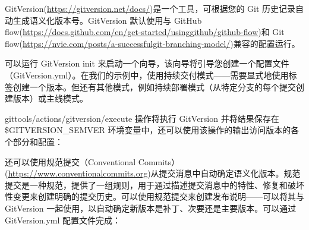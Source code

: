 

GitVersion(\url{https://gitversion.net/docs/})是一个工具，可根据您的 Git 历史记录自动生成语义化版本号。GitVersion 默认使用与 GitHub flow(\url{https://docs.github.com/en/get-started/usinggithub/github-flow})和 Git flow(\url{https://nvie.com/posts/a-successfulgit-branching-model/})兼容的配置运行。

可以运行 GitVersion init 来启动一个向导，该向导将引导您创建一个配置文件（GitVersion.yml）。在我们的示例中，使用持续交付模式——需要显式地使用标签创建一个版本。但还有其他模式，例如持续部署模式（从特定分支的每个提交创建版本）或主线模式。

gittools/actions/gitversion/execute 操作将执行 GitVersion 并将结果保存在 \$GITVERSION\_SEMVER 环境变量中，还可以使用该操作的输出访问版本的各个部分和配置：



还可以使用规范提交（Conventional Commits）(\url{https://www.conventionalcommits.org})从提交消息中自动确定语义化版本。规范提交是一种规范，提供了一组规则，用于通过描述提交消息中的特性、修复和破坏性变更来创建明确的提交历史。可以使用规范提交来创建发布说明——可以将其与 GitVersion 一起使用，以自动确定新版本是补丁、次要还是主要版本。可以通过 GitVersion.yml 配置文件完成：

